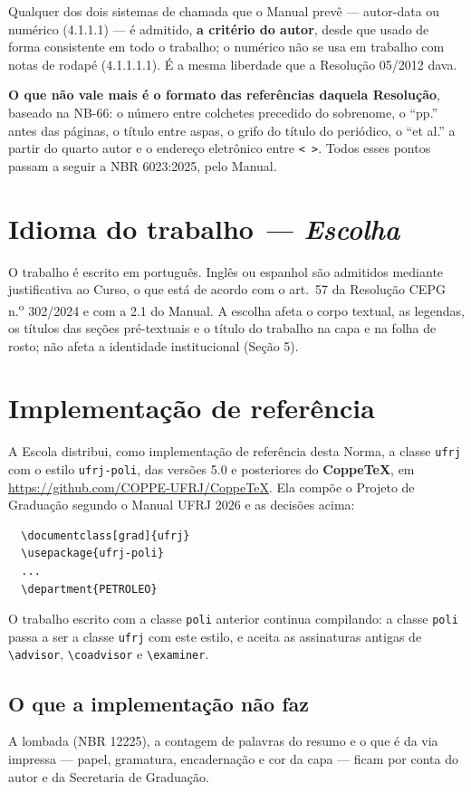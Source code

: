 \documentclass[a4paper,11pt]{article}
\newcommand\tipo[1]{\normalfont\textit{--- #1}}
\begin{document}
Qualquer dos dois sistemas de chamada que o Manual prevê --- autor-data ou
numérico (4.1.1.1) --- é admitido, \textbf{a critério do autor}, desde que
usado de forma consistente em todo o trabalho; o numérico não se usa em
trabalho com notas de rodapé (4.1.1.1.1). É a mesma liberdade que a Resolução
05/2012 dava.

\textbf{O que não vale mais é o formato das referências daquela Resolução},
baseado na NB-66: o número entre colchetes precedido do sobrenome, o ``pp.''
antes das páginas, o título entre aspas, o grifo do título do periódico, o
``et al.'' a partir do quarto autor e o endereço eletrônico entre
\texttt{<\,>}. Todos esses pontos passam a seguir a NBR 6023:2025, pelo Manual.

\section{Idioma do trabalho \tipo{Escolha}}

O trabalho é escrito em português. Inglês ou espanhol são admitidos mediante
justificativa ao Curso, o que está de acordo com o art.~57 da Resolução CEPG
n.\textsuperscript{o} 302/2024 e com a 2.1 do Manual. A escolha afeta o corpo
textual, as legendas, os títulos das seções pré-textuais e o título do trabalho
na capa e na folha de rosto; não afeta a identidade institucional (Seção 5).

\section{Implementação de referência}

A Escola distribui, como implementação de referência desta Norma, a classe
\texttt{ufrj} com o estilo \texttt{ufrj-poli}, das versões 5.0 e posteriores do
\textbf{CoppeTeX}, em \url{https://github.com/COPPE-UFRJ/CoppeTeX}. Ela compõe
o Projeto de Graduação segundo o Manual UFRJ 2026 e as decisões acima:

\begin{verbatim}
  \documentclass[grad]{ufrj}
  \usepackage{ufrj-poli}
  ...
  \department{PETROLEO}
\end{verbatim}

O trabalho escrito com a classe \texttt{poli} anterior continua compilando: a
classe \texttt{poli} passa a ser a classe \texttt{ufrj} com este estilo, e
aceita as assinaturas antigas de \verb|\advisor|, \verb|\coadvisor| e
\verb|\examiner|.

\subsection{O que a implementação não faz}

A lombada (NBR 12225), a contagem de palavras do resumo e o que é da via
impressa --- papel, gramatura, encadernação e cor da capa --- ficam por conta
do autor e da Secretaria de Graduação.
\end{document}
